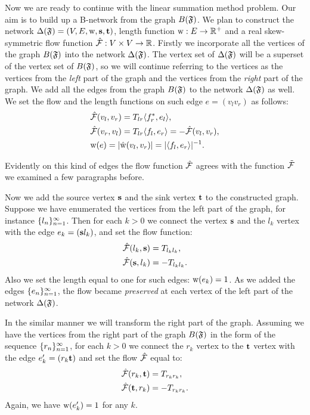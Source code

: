 \documentclass[12pt]{amsart}
\begin{document}
    Now we are ready to continue with the linear summation method problem.
    Our aim is to build up a B-network from the graph $B(\mathfrak{F})$.
    We plan to construct the network $\Delta(\mathfrak{F}) = (V, E, \mathrm{w}, \mathbf{s}, \mathbf{t})$,
      length function $\mathrm{w}: E \to \mathbb{R}^{+}$ and a real skew-symmetric flow function $\mathcal{\hat{F}}: V \times V \to \mathbb{R}$.
    Firstly we incorporate all the vertices of the graph $B(\mathfrak{F})$ into the network $\Delta(\mathfrak{F})$.
    The vertex set of $\Delta(\mathfrak{F})$ will be a superset of the vertex set of $B(\mathfrak{F})$,
      so we will continue referring to the vertices as the vertices from
      the \emph{left} part of the graph and the vertices from the \emph{right} part of the graph.
    We add all the edges from the graph $B(\mathfrak{F})$ to the network $\Delta(\mathfrak{F})$ as well.
    We set the flow and the length functions on such edge $e = (v_l v_r)$ as follows:
    \begin{align*}
      &\mathcal{\hat{F}}(v_l, v_r) = T_{lr} \langle f^*_r, e_l \rangle,\\
      &\mathcal{\hat{F}}(v_r, v_l) = T_{lr} \langle f_l, e_r \rangle = -\mathcal{\hat{F}}(v_l, v_r),\\
      &\mathrm{w}(e) = \lvert \mathrm{\hat{w}}(v_l, v_r) \rvert =  \lvert\langle f_l, e_r \rangle\rvert^{-1}.
    \end{align*}
    \begin{note}
      Evidently on this kind of edges the flow function $\mathcal{\hat{F}}$ agrees with the function $\mathcal{\tilde{F}}$
        we examined a few paragraphs before.
    \end{note}

    Now we add the source vertex $\mathbf{s}$ and the sink vertex $\mathbf{t}$ to the constructed graph.
    Suppose we have enumerated the vertices from the left part of the graph, for instance $\{{l}_n\}_{n=1}^\infty$.
    Then for each $k > 0$ we connect the vertex $\mathbf{s}$ and the $l_k$ vertex with
      the edge $e_k = (\mathbf{s} l_k)$, and set the flow function:
    \begin{align*}
      &\mathcal{\hat{F}}(l_k, \mathbf{s}) = T_{l_k l_k},\\
      &\mathcal{\hat{F}}(\mathbf{s}, l_k) = -T_{l_k l_k}.
    \end{align*}
    Also we set the length equal to one for such edges: $\mathrm{w}(e_k) = 1$.
    As we added the edges $\{{e}_n\}_{n=1}^\infty$, the flow became \emph{preserved} at each vertex of the left part of the network $\Delta(\mathfrak{F})$.

    In the similar manner we will transform the right part of the graph.
    Assuming we have the vertices from the right part of the graph $B(\mathfrak{F})$ in the form of the sequence $\{{r}_n\}_{n=1}^\infty$,
      for each $k > 0$ we connect the $r_k$ vertex to the $\mathbf{t}$ vertex with the edge $e'_k=(r_k \mathbf{t})$
      and set the flow $\mathcal{\hat{F}}$ equal to:
    \begin{align*}
      &\mathcal{\hat{F}}(r_k, \mathbf{t}) = T_{r_k r_k},\\
      &\mathcal{\hat{F}}(\mathbf{t}, r_k) = -T_{r_k r_k}.
    \end{align*}
    Again, we have $\mathrm{w}(e'_k) = 1$ for any $k$.
\end{document}
